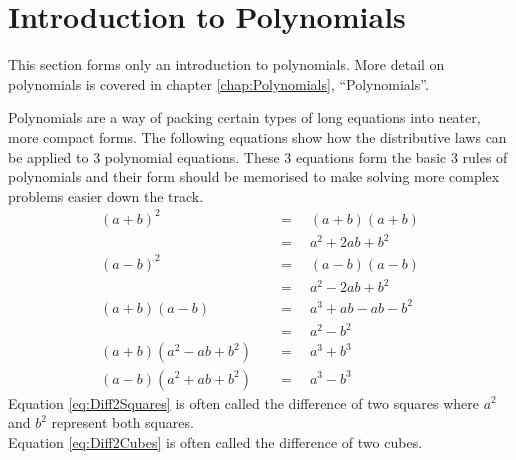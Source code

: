 \section{Introduction to Polynomials}
\label{sec:IntroductionToPolynomials}
This section forms only an introduction to polynomials. More detail on
polynomials is covered in chapter \ref{chap:Polynomials}, ``Polynomials''.

Polynomials are a way of packing certain types of long equations into neater,
more compact forms. The following equations show how the distributive laws can
be applied to 3 polynomial equations. These 3 equations form the basic 3 rules
of polynomials and their form should be memorised to make solving more complex
problems easier down the track.
\begin{align}
  {(a+b)}^{2} & \quad = \quad (a+b)(a+b) \nonumber \\
              & \quad = \quad {a}^{2} + 2ab + {b}^{2} \label{eq:poly0} \\
  {(a-b)}^{2} & \quad = \quad (a-b)(a-b) \nonumber \\
              & \quad = \quad {a}^{2} - 2ab + {b}^{2} \label{eq:poly1} \\
  (a+b)(a-b)  & \quad = \quad {a}^{3} + ab - ab - {b}^{2} \nonumber \\ 
              & \quad = \quad {a}^{2} - {b}^{2} \label{eq:Diff2Squares} \\
  (a+b)({a}^{2} - ab + {b}^{2}) & \quad = \quad {a}^{3} + {b}^{3}
  \label{eq:Sum2Cubes} \\
  (a-b)({a}^{2} + ab + {b}^{2}) & \quad = \quad {a}^{3} - {b}^{3}
  \label{eq:Diff2Cubes}
\end{align}
Equation \ref{eq:Diff2Squares} is often called the difference of two squares where
${a}^{2}$ and ${b}^{2}$ represent both squares. \\
Equation \ref{eq:Diff2Cubes} is often called the difference of two cubes.
